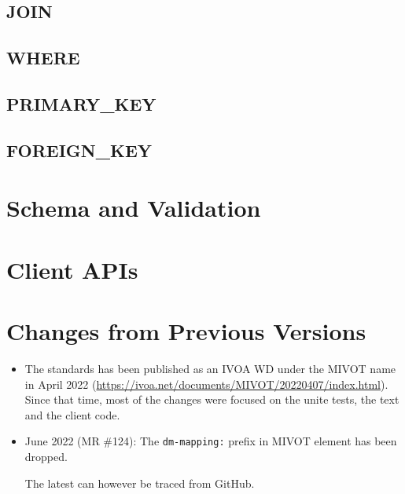 \documentclass[11pt,a4paper]{ivoa}
\begin{document}
\subsection{JOIN} \label{JOIN}

\FloatBarrier

\subsection{WHERE} \label{WHERE}

\FloatBarrier

\subsection{PRIMARY\_KEY} \label{PRIMARY_KEY}

\FloatBarrier

\subsection{FOREIGN\_KEY} \label{FOREIGN_KEY}

\FloatBarrier



\pagebreak
\section{Schema and Validation}


\pagebreak
\section{Client APIs}


\section{Changes from Previous Versions}
\begin{itemize}
\item The standards has been published as an IVOA WD under the MIVOT name in April 2022 
      (\url{https://ivoa.net/documents/MIVOT/20220407/index.html}). 
      Since that time, most of the changes were focused on the unite tests, the text and the client code.
\item June 2022 (MR \#124): The \texttt{dm-mapping:} prefix in MIVOT element has been dropped. 

The latest can however be traced from GitHub.
\end{itemize}
\pagebreak

\appendix 
\end{document}
